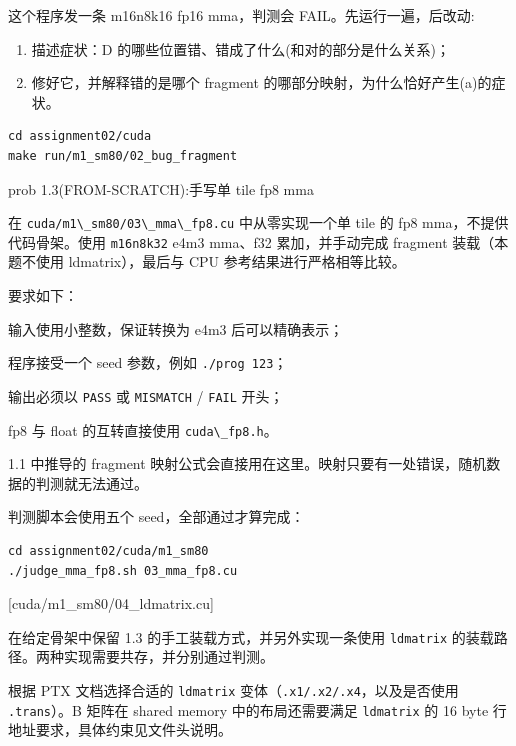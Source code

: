 \documentclass[11pt,a4paper,fontset=none]{ctexart}
\providecommand{\passthrough}[1]{#1}
\begin{document}
这个程序发一条 m16n8k16 fp16 mma，判测会 FAIL。先运行一遍，后改动:

\begin{enumerate}
\def\labelenumi{(\alph{enumi})}
\item
  描述症状：D 的哪些位置错、错成了什么(和对的部分是什么关系)；
\item
  修好它，并解释错的是哪个 fragment
  的哪部分映射，为什么恰好产生(a)的症状。
\end{enumerate}

\begin{lstlisting}
cd assignment02/cuda
make run/m1_sm80/02_bug_fragment
\end{lstlisting}

\begin{capstone}{prob 1.3(FROM-SCRATCH):手写单 tile fp8 mma}

在 \passthrough{\lstinline!cuda/m1\_sm80/03\_mma\_fp8.cu!}
中从零实现一个单 tile 的 fp8 mma，不提供代码骨架。使用
\passthrough{\lstinline!m16n8k32!} e4m3 mma、f32 累加，并手动完成
fragment 装载（本题不使用 ldmatrix），最后与 CPU
参考结果进行严格相等比较。

要求如下：

输入使用小整数，保证转换为 e4m3 后可以精确表示；

程序接受一个 seed 参数，例如 \passthrough{\lstinline!./prog 123!}；

输出必须以 \passthrough{\lstinline!PASS!} 或
\passthrough{\lstinline!MISMATCH!} / \passthrough{\lstinline!FAIL!}
开头；

fp8 与 float 的互转直接使用 \passthrough{\lstinline!cuda\_fp8.h!}。

1.1 中推导的 fragment
映射公式会直接用在这里。映射只要有一处错误，随机数据的判测就无法通过。

判测脚本会使用五个 seed，全部通过才算完成：

\begin{lstlisting}
cd assignment02/cuda/m1_sm80
./judge_mma_fp8.sh 03_mma_fp8.cu
\end{lstlisting}

\end{capstone}

[cuda/m1\_sm80/04\_ldmatrix.cu]

在给定骨架中保留 1.3 的手工装载方式，并另外实现一条使用
\passthrough{\lstinline!ldmatrix!}
的装载路径。两种实现需要共存，并分别通过判测。

根据 PTX 文档选择合适的 \passthrough{\lstinline!ldmatrix!}
变体（\passthrough{\lstinline!.x1/.x2/.x4!}，以及是否使用
\passthrough{\lstinline!.trans!}）。B 矩阵在 shared memory
中的布局还需要满足 \passthrough{\lstinline!ldmatrix!} 的 16 byte
行地址要求，具体约束见文件头说明。
\end{document}
